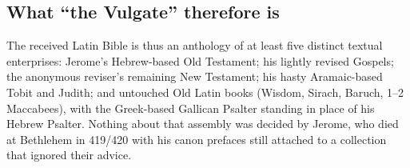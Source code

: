 \subsection{What ``the Vulgate'' therefore is}

The received Latin Bible is thus an anthology of at least five distinct
textual enterprises: Jerome's Hebrew-based Old Testament; his lightly
revised Gospels; the anonymous reviser's remaining New Testament; his
hasty Aramaic-based Tobit and Judith; and untouched Old Latin books
(Wisdom, Sirach, Baruch, 1--2 Maccabees), with the Greek-based Gallican
Psalter standing in place of his Hebrew Psalter. Nothing about that
assembly was decided by Jerome, who died at Bethlehem in 419/420 with his
canon prefaces still attached to a collection that ignored their
advice.
